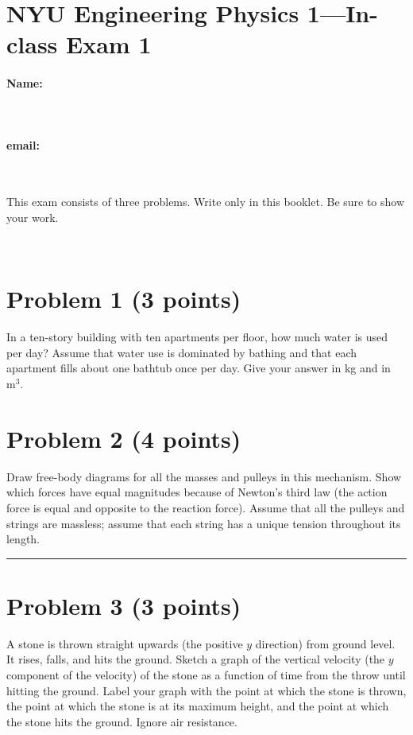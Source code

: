 \documentclass[12pt]{article}
\begin{document}
\section*{NYU Engineering Physics 1---In-class Exam 1}

\vfill

\paragraph{Name:} ~

\paragraph{email:} ~

\vfill

This exam consists of three problems.  Write only in this booklet.  Be
sure to show your work.

\vfill ~

\clearpage

\section*{Problem 1 (3 points)}

In a ten-story building with ten apartments per floor, how much water
is used per day?  Assume that water use is dominated by bathing and
that each apartment fills about one bathtub once per day.  Give your
answer in kg and in $\mathrm{m^3}$.

\clearpage

\section*{Problem 2 (4 points)}

Draw free-body diagrams for all the masses and pulleys in this
mechanism.  Show which forces have equal magnitudes because of
Newton's third law (the action force is equal and opposite to the
reaction force).  Assume that all the pulleys and strings are
massless; assume that each string has a unique tension throughout its
length.\\ \rule{0.35\textwidth}{0pt}

\clearpage

\section*{Problem 3 (3 points)}

A stone is thrown straight upwards (the positive $y$ direction) from
ground level.  It rises, falls, and hits the ground.  Sketch a graph
of the vertical velocity (the $y$ component of the velocity) of the
stone as a function of time from the throw until hitting the ground.
Label your graph with the point at which the stone is thrown, the
point at which the stone is at its maximum height, and the point at
which the stone hits the ground.  Ignore air resistance.
\end{document}
